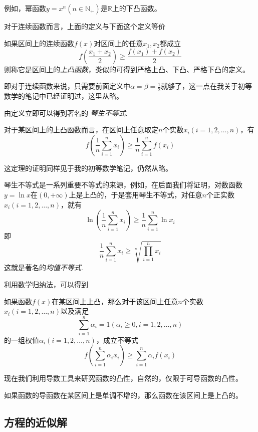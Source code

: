 例如，幂函数$y=x^n(n \in \mathbb{N}_+)$是$\mathbb{R}$上的下凸函数。

对于连续函数而言，上面的定义与下面这个定义等价
\begin{definition}
  如果区间上的连续函数$f(x)$对区间上的任意$x_1,x_2$都成立
  \[ f \left( \frac{x_1+x_2}{2} \right) \geqslant \frac{f(x_1)+f(x_2)}{2} \]
  则称它是区间上的\emph{上凸函数}，类似的可得到严格上凸、下凸、严格下凸的定义。
\end{definition}

即对于连续函数来说，只需要前面定义中$\alpha=\beta=\frac{1}{2}$就够了，这一点在我关于初等数学的笔记中已经证明过，这里从略。

由定义立即可以得到著名的 \emph{琴生不等式}.
\begin{theorem}
  对于某区间上的上凸函数而言，在区间上任意取定$n$个实数$x_i(i=1,2,\ldots,n)$，有
  \[ f \left( \frac{1}{n} \sum_{i=1}^n x_i \right) \geqslant \frac{1}{n} \sum_{i=1}^n f(x_i) \]
\end{theorem}

这定理的证明同样见于我的初等数学笔记，仍然从略。

\begin{example}
  琴生不等式是一系列重要不等式的来源，例如，在后面我们将证明，对数函数$y=\ln{x}$在$(0,+\infty)$上是上凸的，于是套用琴生不等式，对任意$n$个正实数$x_i(i=1,2,\ldots,n)$，就有
  \[ \ln{\left( \frac{1}{n} \sum_{i=1}^n x_i \right)} \geqslant \frac{1}{n} \sum_{i=1}^n \ln{x_i} \]
  即
  \[ \frac{1}{n} \sum_{i=1}^n x_i \geqslant \sqrt[n]{\prod_{i=1}^n x_i} \]
  这就是著名的\emph{均值不等式}.
\end{example}

利用数学归纳法，可以得到
\begin{theorem}
  如果函数$f(x)$在某区间上上凸，那么对于该区间上任意$n$个实数$x_i(i=1,2,\ldots,n)$以及满足
  \[ \sum_{i=1}^n \alpha_i=1(\alpha_i \geqslant 0,i=1,2,\ldots,n) \]
  的一组权值$\alpha_i(i=1,2,\ldots,n)$，成立不等式
  \[ f \left( \sum_{i=1}^n \alpha_i x_i \right) \geqslant \sum_{i=1}^n \alpha_i f(x_i) \]
\end{theorem}

现在我们利用导数工具来研究函数的凸性，自然的，仅限于可导函数的凸性。

\begin{theorem}
  如果函数的导函数在某区间上是单调不增的，那么函数在该区间上是上凸的。
\end{theorem}

\subsection{方程的近似解}
\label{sec:approx-solve-of-equation}





